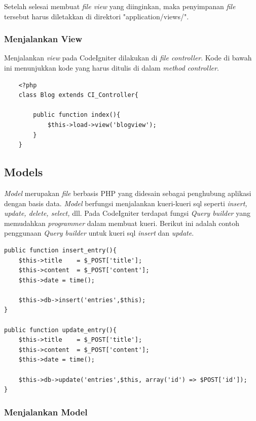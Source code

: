 	Setelah selesai membuat \textit{file view} yang diinginkan, maka penyimpanan \textit{file} tersebut harus diletakkan di direktori "application/views/".
	
	\subsubsection{Menjalankan View}
	\label{subsub: menjalankanView}
	
	Menjalankan \textit{view} pada CodeIgniter dilakukan di \textit{file controller}. Kode di bawah ini menunjukkan kode yang harus ditulis di dalam \textit{method controller}.
	
	\begin{lstlisting}
	<?php
	class Blog extends CI_Controller{
		
		public function index(){
			$this->load->view('blogview');
		}
	}
	\end{lstlisting}
	
	\subsection{Models}
	\label{sub: models}
	
	\textit{Model} merupakan \textit{file} berbasis PHP yang didesain sebagai penghubung aplikasi dengan basis data. \textit{Model} berfungsi menjalankan kueri-kueri sql seperti \textit{insert, update, delete, select,} dll.
	Pada CodeIgniter terdapat fungsi \textit{Query builder} yang memudahkan \textit{programmer} dalam membuat kueri. Berikut ini adalah contoh penggunaan \textit{Query builder} untuk kueri sql \textit{insert} dan \textit{update}.
	
	\begin{lstlisting}
public function insert_entry(){
	$this->title	= $_POST['title'];
	$this->content	= $_POST['content'];
	$this->date	= time();
	
	$this->db->insert('entries',$this);
}

public function update_entry(){
	$this->title	= $_POST['title'];
	$this->content	= $_POST['content'];
	$this->date	= time();
	
	$this->db->update('entries',$this, array('id') => $POST['id']);
}
	\end{lstlisting}
	
	\subsubsection{Menjalankan Model}
	\label{subsub: menjalankanModel}
		
